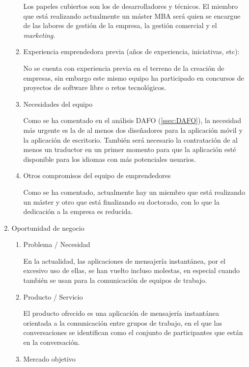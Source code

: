 \documentclass[11pt,leqno]{article}
\begin{document}
\begin{enumerate}
\begin{enumerate}[a]
	Los papeles cubiertos son los de desarrolladores y técnicos.
	El miembro que está realizando actualmente un máster MBA será
	quien se encargue de las labores de gestión de la empresa, la 
	gestión comercial y el \textit{marketing}. 
	
\item Experiencia emprendedora previa (años de experiencia, iniciativas, etc):

	No se cuenta con experiencia previa en el terreno de la creación 
	de empresas, sin embargo este mismo equipo ha participado en
	concursos de proyectos de software libre o retos 
	tecnológicos.
	
\item Necesidades del equipo 

	Como se ha comentado en el análisis DAFO (\ref{ssec:DAFO}), 
	la necesidad más urgente es la de al menos dos diseñadores para
	la aplicación móvil y la aplicación de escritorio. 
	También será necesario la contratación de al menos un traductor en
	un primer momento para que la aplicación esté disponible para los 
	idiomas con más potenciales usuarios.
	
\item Otros compromisos del equipo de emprendedores

	Como se ha comentado, actualmente hay un miembro que está realizando
	un máster y otro que está finalizando su doctorado, con lo que la
	dedicación a la empresa es reducida.
	
\end{enumerate}


\item Oportunidad de negocio

\begin{enumerate}[a]
\item Problema / Necesidad 

	En la actualidad, las aplicaciones de mensajería instantánea, 
	por el excesivo uso de ellas, se han vuelto incluso molestas, 
	en especial cuando también se usan para la comunicación de equipos
	de trabajo.

\item Producto / Servicio 

	El producto ofrecido es una aplicación de mensajería instantánea
	orientada a la comunicación entre grupos de trabajo, en el que 
	las conversaciones se identifican como el conjunto de participantes 
	que están en la conversación.

\item  Mercado objetivo 


\end{enumerate}
\end{enumerate}
\end{document}
